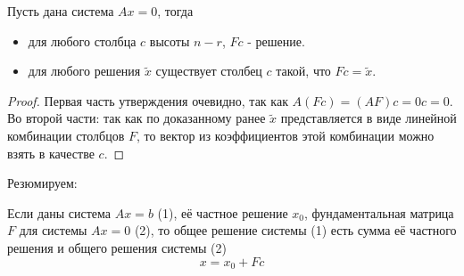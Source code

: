 \begin{proposition}
\label{Общее решение однородной системы.}
    Пусть дана система $Ax=0$, тогда 
    \begin{itemize}
        \item для любого столбца $c$ высоты $n-r$,  $Fc$ - решение.
        \item для любого решения $\tilde{x}$ существует столбец $c$ такой, что $Fc=\tilde{x}$.
    \end{itemize}
\end{proposition}
\begin{proof}
    Первая часть утверждения очевидно, так как $A(Fc)=(AF)c=0c=0$. Во второй части: так как по доказанному ранее $\tilde{x}$ представляется в виде линейной комбинации столбцов $F$, то вектор из коэффициентов этой комбинации можно взять в качестве $c$.
\end{proof}
Резюмируем:
\begin{proposition}
\label{Общее решение неоднородной системы.}
    Если даны система $Ax=b$ (1), её частное решение $x_0$, фундаментальная матрица $F$ для системы $Ax=0$ (2), то общее решение системы (1) есть сумма её частного решения и общего решения системы (2) \[x=x_0+Fc\]
\end{proposition}
